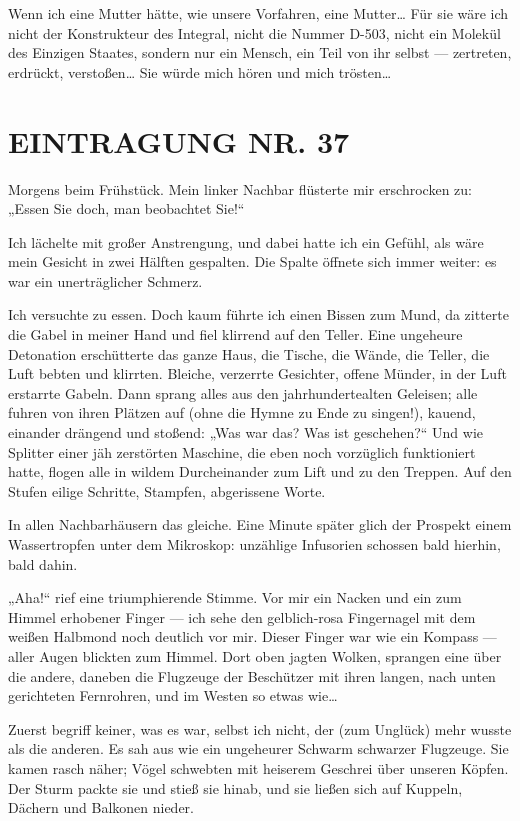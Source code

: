 Wenn ich eine Mutter hätte, wie
unsere Vorfahren, eine Mutter\ldots{} Für sie wäre ich nicht der
Konstrukteur des Integral, nicht die Nummer D-503, nicht ein
Molekül des Einzigen Staates, sondern nur ein Mensch, ein Teil von
ihr selbst — zertreten, erdrückt, verstoßen\ldots{} Sie würde mich hören
und mich trösten\ldots{}

\section{EINTRAGUNG NR. 37}

Morgens beim Frühstück. Mein linker Nachbar flüsterte mir
erschrocken zu: „Essen Sie doch, man beobachtet Sie!“

Ich lächelte mit großer Anstrengung, und dabei hatte ich ein
Gefühl, als wäre mein Gesicht in zwei Hälften gespalten. Die Spalte
öffnete sich immer weiter: es war ein unerträglicher Schmerz.

Ich versuchte zu essen. Doch kaum führte ich einen Bissen zum Mund,
da zitterte die Gabel in meiner Hand und fiel klirrend auf den
Teller. Eine ungeheure Detonation erschütterte das ganze Haus, die
Tische, die Wände, die Teller, die Luft bebten und klirrten.
Bleiche, verzerrte Gesichter, offene Münder, in der Luft erstarrte
Gabeln. Dann sprang alles aus den jahrhundertealten Geleisen; alle
fuhren von ihren Plätzen auf (ohne die Hymne zu Ende zu singen!),
kauend, einander drängend und stoßend: „Was war das? Was ist
geschehen?“ Und wie Splitter einer jäh zerstörten Maschine, die
eben noch vorzüglich funktioniert hatte, flogen alle in wildem
Durcheinander zum Lift und zu den Treppen. Auf den Stufen eilige
Schritte, Stampfen, abgerissene Worte.

In allen Nachbarhäusern das
gleiche. Eine Minute später glich der Prospekt einem Wassertropfen
unter dem Mikroskop: unzählige Infusorien schossen bald hierhin,
bald dahin.

„Aha!“ rief eine triumphierende Stimme. Vor mir ein Nacken und ein
zum Himmel erhobener Finger — ich sehe den gelblich-rosa
Fingernagel mit dem weißen Halbmond noch deutlich vor mir. Dieser
Finger war wie ein
Kompass — aller Augen blickten zum Himmel. Dort oben jagten Wolken,
sprangen eine über die andere, daneben die Flugzeuge der Beschützer
mit ihren langen, nach unten gerichteten Fernrohren, und im Westen
so etwas wie\ldots{}

Zuerst begriff keiner, was es war, selbst ich nicht, der (zum
Unglück) mehr wusste als die anderen. Es sah aus wie ein ungeheurer
Schwarm schwarzer Flugzeuge. Sie kamen rasch näher; Vögel schwebten
mit heiserem Geschrei über unseren Köpfen. Der Sturm packte sie und
stieß sie hinab, und sie ließen sich auf Kuppeln, Dächern und
Balkonen nieder.

